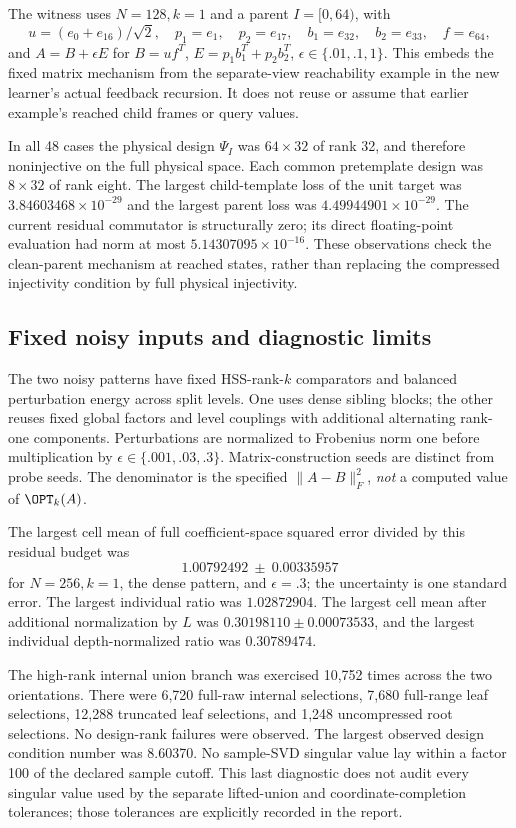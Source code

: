 \documentclass[11pt,oneside,openany,a4paper]{book}
\numberwithin{equation}{chapter}
\theoremstyle{definition}
\theoremstyle{remark}
\begin{document}
The witness uses $N=128,k=1$ and a parent $I=[0,64)$, with
\[
 u=(e_0+e_{16})/\sqrt2,\quad p_1=e_1,\quad p_2=e_{17},
 \quad b_1=e_{32},\quad b_2=e_{33},\quad f=e_{64},
\]
and $A=B+\epsilon E$ for
$B=uf^T$, $E=p_1b_1^T+p_2b_2^T$,
$\epsilon\in\{.01,.1,1\}$.  This embeds the fixed matrix mechanism
from the separate-view reachability example in the new learner's
actual feedback recursion.  It does not reuse or assume that earlier
example's reached child frames or query values.

In all 48 cases the physical design $\Psi_I$ was $64\times32$ of rank
32, and therefore noninjective on the full physical space.  Each common
pretemplate design was $8\times32$ of rank eight.  The largest
child-template loss of the unit target was
$3.84603468\times10^{-29}$ and the largest parent loss was
$4.49944901\times10^{-29}$.  The current residual commutator is
structurally zero; its direct floating-point evaluation had norm at
most $5.14307095\times10^{-16}$.  These observations check the
clean-parent mechanism at reached states, rather than replacing the
compressed injectivity condition by full physical injectivity.

\subsection{Fixed noisy inputs and diagnostic limits}

The two noisy patterns have fixed HSS-rank-$k$ comparators and balanced
perturbation energy across split levels.  One uses dense sibling
blocks; the other reuses fixed global factors and level couplings with
additional alternating rank-one components.  Perturbations are
normalized to Frobenius norm one before multiplication by
$\epsilon\in\{.001,.03,.3\}$.  Matrix-construction seeds are distinct
from probe seeds.  The denominator is the specified
$\lVert A-B\rVert_F^2$, \emph{not} a computed value of $\OPT_k(A)$.

The largest cell mean of full coefficient-space squared error divided
by this residual budget was
\[
 1.00792492\ \pm\ 0.00335957
\]
for $N=256,k=1$, the dense pattern, and $\epsilon=.3$; the uncertainty
is one standard error.  The largest individual ratio was
$1.02872904$.  The largest cell mean after additional normalization by
$L$ was $0.30198110\pm0.00073533$, and the largest individual
depth-normalized ratio was $0.30789474$.

The high-rank internal union branch was exercised 10,752 times across
the two orientations.  There were 6,720 full-raw internal selections,
7,680 full-range leaf selections, 12,288 truncated leaf selections,
and 1,248 uncompressed root selections.  No design-rank failures were
observed.  The largest observed design condition number was 8.60370.
No sample-SVD singular value lay within a factor 100 of the declared
sample cutoff.  This last diagnostic does not audit every singular
value used by the separate lifted-union and coordinate-completion
tolerances; those tolerances are explicitly recorded in the report.
\end{document}
